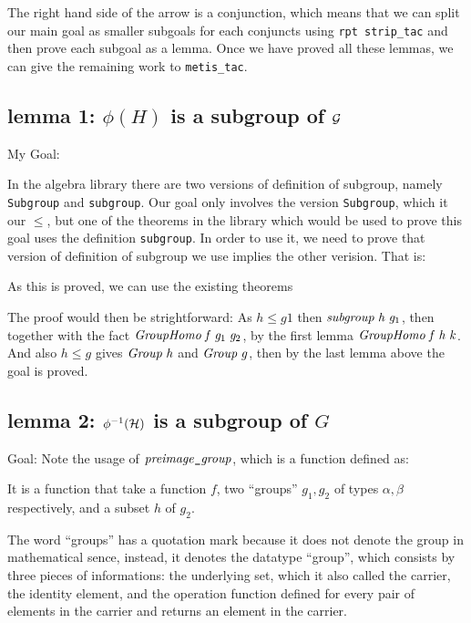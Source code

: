 \documentclass{report}
\renewcommand{\HOLinline}[1]{\ensuremath{#1}}
\begin{document}
The right hand side of the arrow is a conjunction, which means that we can split our main goal as smaller subgoals for each conjuncts using \texttt{rpt strip_tac} and then prove each subgoal as a lemma. Once we have proved all these lemmas, we can give the remaining work to \texttt{metis_tac}.

\subsection{lemma 1: $\phi (H)$ is a subgroup of ${\cal G}$}

My Goal:

In the algebra library there are two versions of definition of subgroup, namely \texttt{Subgroup} and \texttt{subgroup}. Our goal only involves the version \texttt{Subgroup}, which it our $\leq$, but one of the theorems in the library which would be used to prove this goal uses the definition \texttt{subgroup}. In order to use it, we need to prove that version of definition of subgroup we use implies the other verision. That is:

As this is proved, we can use the existing theorems

The proof would then be strightforward: As $h \leq g1$ then \HOLinline{\HOLFreeVar{subgroup}\;\HOLFreeVar{h}\;\HOLFreeVar{g\sb{\mathrm{1}}}}, then together with the fact \HOLinline{\HOLFreeVar{GroupHomo}\;\HOLFreeVar{f}\;\HOLFreeVar{g\sb{\mathrm{1}}}\;\HOLFreeVar{g\sb{\mathrm{2}}}}, by the first lemma \HOLinline{\HOLFreeVar{GroupHomo}\;\HOLFreeVar{f}\;\HOLFreeVar{h}\;\HOLFreeVar{k}}. And also $h\leq g$ gives \HOLinline{\HOLFreeVar{Group}\;\HOLFreeVar{h}} and \HOLinline{\HOLFreeVar{Group}\;\HOLFreeVar{g}}, then by the last lemma above the goal is proved.

\subsection{lemma 2: $\phi^{-1}({\cal H})$ is a subgroup of $G$}

Goal:
Note the usage of \HOLinline{\HOLFreeVar{preimage\HOLTokenUnderscore{}group}}, which is a function defined as:

It is a function that take a function $f$, two ``groups'' $g_1,g_2$ of types $\alpha,\beta$ respectively, and a subset $h$ of $g_2$.

The word ``groups'' has a quotation mark because it does not denote the group in mathematical sence, instead, it denotes the datatype ``group'', which consists by three pieces of informations: the underlying set, which it also called the carrier, the identity element, and the operation function defined for every pair of elements in the carrier and returns an element in the carrier.
\end{document}
